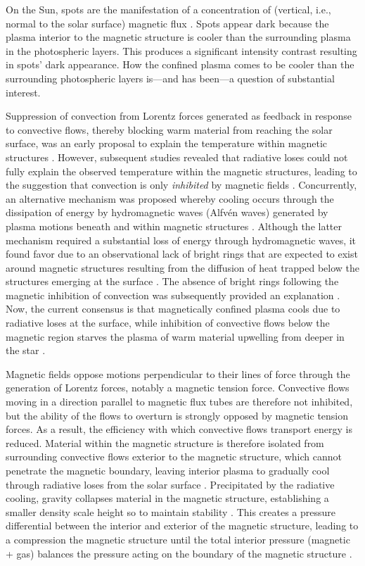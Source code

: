 On the Sun, spots are the manifestation of a concentration of (vertical, i.e., normal to the solar surface) magnetic flux \citep{Hale1908}. Spots appear dark because the plasma interior to the magnetic structure is cooler than the surrounding plasma in the photospheric layers. This produces a significant intensity contrast resulting in spots' dark appearance. How the confined plasma comes to be cooler than the surrounding photospheric layers is---and has been---a question of substantial interest. 

Suppression of convection from Lorentz forces generated as feedback in response to convective flows, thereby blocking warm material from reaching the solar surface, was an early proposal to explain the temperature within magnetic structures \citep{Biermann1941}. However, subsequent studies revealed that radiative loses could not fully explain the observed temperature within the magnetic structures, leading to the suggestion that convection is only \emph{inhibited} by magnetic fields \citep{Deinzer1965}. Concurrently, an alternative mechanism was proposed whereby cooling occurs through the dissipation of energy by hydromagnetic waves (Alfv\'{e}n waves) generated by plasma motions beneath and within magnetic structures \citep{Alfven1942,Parker1974b}. Although the latter mechanism required a substantial loss of energy through hydromagnetic waves, it found favor due to an observational lack of bright rings that are expected to exist around magnetic structures resulting from the diffusion of heat trapped below the structures emerging at the surface \citep{Parker1974b}. The absence of bright rings following the magnetic inhibition of convection was subsequently provided an explanation \citep{Spruit1977,Spruit1982a}. Now, the current consensus is that magnetically confined plasma cools due to radiative loses at the surface, while inhibition of convective flows below the magnetic region starves the plasma of warm material upwelling from deeper in the star \citep[see, e.g., reviews by][]{Rempel2011,Stein2012}.  

Magnetic fields oppose motions perpendicular to their lines of force through the generation of Lorentz forces, notably a magnetic tension force. Convective flows moving in a direction parallel to magnetic flux tubes are therefore not inhibited, but the ability of the flows to overturn is strongly opposed by magnetic tension forces. As a result, the efficiency with which convective flows transport energy is reduced. Material within the magnetic structure is therefore isolated from surrounding convective flows exterior to the magnetic structure, which cannot penetrate the magnetic boundary, leaving interior plasma to gradually cool through radiative loses from the solar surface \citep{Stein2012}. Precipitated by the radiative cooling, gravity collapses material in the magnetic structure, establishing a smaller density scale height so to maintain stability \citep{Parker1978}. This creates a pressure differential between the interior and exterior of the magnetic structure, leading to a compression the magnetic structure until the total interior pressure (magnetic + gas) balances the pressure acting on the boundary of the magnetic structure \citep{Parker1978,Spruit1979}.

